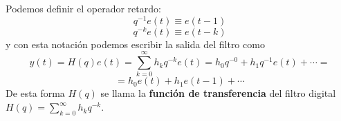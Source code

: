 \begin{nota}
Podemos definir el operador retardo:
\[	q^{-1}e(t) \equiv e(t-1)	\]
\[	q^{-k}e(t) \equiv e(t-k)	\]
y con esta notación podemos escribir la salida del filtro como
\[	y(t) = H(q)e(t) = \sum_{k=0}^{\infty} h_k q^{-k} e(t) = h_0q^{-0}+h_1q^{-1}e(t)+ \cdots = \]
\[ = h_0e(t) + h_1e(t-1) + \cdots	\]
De esta forma $H(q)$ se llama la \textbf{función de transferencia} del filtro digital $H(q) = \sum_{k=0}^{\infty} h_k q^{-k}$.
\end{nota}





%